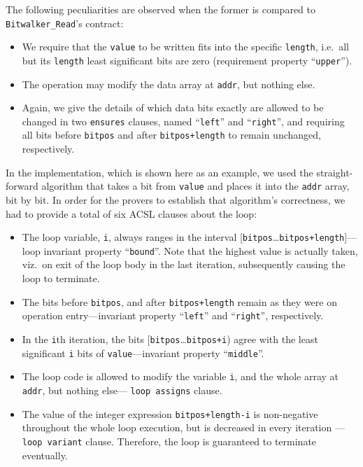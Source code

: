 \FloatBarrier


The following peculiarities are observed when the former is
compared to \lstinline{Bitwalker_Read}'s contract:
%
\begin{itemize}
\item We require that the \lstinline{value} to be written fits into
the specific
	\lstinline{length}, i.e.\ all but its \lstinline{length}
	least significant bits are
	zero (requirement property ``\lstinline{upper}'').
\item The operation may modify the data array at \lstinline{addr},
but nothing else.
\item Again, we give the details of which data bits exactly
	are allowed to be changed in two
	\lstinline{ensures} clauses, named ``\lstinline{left}'' and
	``\lstinline{right}'', and requiring all bits before
	\lstinline{bitpos} and after
	\lstinline{bitpos+length} to remain unchanged, respectively.
\end{itemize}

In the implementation, which is shown here as an example, we used
the straight-forward
algorithm that takes a bit from \lstinline{value} and places it into
the \lstinline{addr} array, bit by bit.
%
In order for the provers to establish that algorithm's correctness,
we had to provide a total of six ACSL clauses about the loop:
%
\begin{itemize}
\item The loop variable, \lstinline{i}, always ranges in the interval
	[\lstinline{bitpos}\ldots\lstinline{bitpos+length}]---loop invariant property ``\lstinline{bound}''.
	Note that the highest value is actually taken,
	viz.\ on exit of the loop body in the last iteration,
	subsequently causing the loop to terminate.
\item The bits before \lstinline{bitpos}, and after
	\lstinline{bitpos+length}
	remain as they were on operation entry---invariant property
	``\lstinline{left}'' and ``\lstinline{right}'', respectively.
\item In the \lstinline{i}th iteration, the bits
	[\lstinline{bitpos}\ldots\lstinline{bitpos+i}) agree with
	the least significant
	\lstinline{i} bits of \lstinline{value}---invariant property
	``\lstinline{middle}''.
\item The loop code is allowed to modify the variable \lstinline{i},
	and the whole array
	at \lstinline{addr}, but nothing else---
	\lstinline{loop assigns} clause.
\item The value of the integer
	expression \lstinline{bitpos+length-i} is non-negative throughout
	the whole loop execution, but is decreased in every iteration 
	--- \lstinline{loop variant} clause.
	Therefore, the loop is guaranteed to terminate eventually.
\end{itemize}




